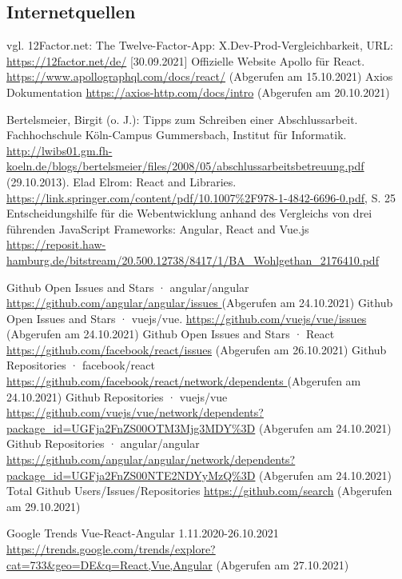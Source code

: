 \subsection{Internetquellen}
\begin{thebibliography}{HR08} %
 
   vgl. 12Factor.net: The Twelve-Factor-App: X.Dev-Prod-Vergleichbarkeit, URL: \url{https://12factor.net/de/} [30.09.2021]
  Offizielle Website Apollo für React. \url{https://www.apollographql.com/docs/react/} (Abgerufen am 15.10.2021)
  Axios Dokumentation \url{https://axios-http.com/docs/intro} (Abgerufen am 20.10.2021)

  Bertelsmeier, Birgit (o. J.): Tipps zum Schrei\-b\-en ei\-n\-er Ab\-sch\-luss\-ar\-beit. Fach\-hoch\-schu\-le Köln-Campus Gummersbach, Institut für Informatik. \url{http://lwibs01.gm.fh-koeln.de/blogs/bertelsmeier/files/2008/05/abschlussarbeitsbetreuung.pdf} (29.10.2013).
  Elad Elrom: React and Libraries. \url{https://link.springer.com/content/pdf/10.1007%2F978-1-4842-6696-0.pdf}, S. 25
  Entscheidungshilfe für die Webentwicklung anhand des Vergleichs von drei führenden JavaScript Frameworks: Angular, React and Vue.js \url{https://reposit.haw-hamburg.de/bitstream/20.500.12738/8417/1/BA_Wohlgethan_2176410.pdf}
  
  
  Github Open Issues and Stars · angular/angular \url{ https://github.com/angular/angular/issues }  (Abgerufen am 24.10.2021)
   Github Open Issues and Stars · vuejs/vue. \url{ https://github.com/vuejs/vue/issues }  (Abgerufen am 24.10.2021)
   Github Open Issues and Stars · React \url{https://github.com/facebook/react/issues} (Abgerufen am 26.10.2021)
   Github Repositories · facebook/react \url{ https://github.com/facebook/react/network/dependents } (Abgerufen am 24.10.2021)
   Github Repositories · vuejs/vue \url{ https://github.com/vuejs/vue/network/dependents?package_id=UGFja2FnZS00OTM3Mjg3MDY\%3D}
  (Abgerufen am 24.10.2021)
    Github Repositories · angular/angular \url{https://github.com/angular/angular/network/dependents?package_id=UGFja2FnZS00NTE2NDYyMzQ%3D}
  (Abgerufen am 24.10.2021)
   Total Github Users/Issues/Repositories \url{ https://github.com/search}
  (Abgerufen am 29.10.2021)

  Google Trends Vue-React-Angular 1.11.2020-26.10.2021 \url{https://trends.google.com/trends/explore?cat=733&geo=DE&q=React,Vue,Angular} (Abgerufen am 27.10.2021)


\end{thebibliography}
